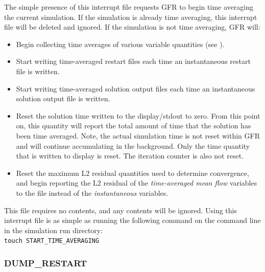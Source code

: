 The simple presence of this interrupt file requests GFR to begin time averaging
the current simulation.
%
If the simulation is already time averaging, this interrupt file will be deleted
and ignored.
%
If the simulation is not time averaging, GFR will:
\begin{itemize}
  \item Begin collecting time averages of various variable quantities (see
    ).
  \item Start writing time-averaged restart files
     each time an instantaneous restart
    file is written.
  \item Start writing time-averaged solution output files
     each time an
    instantaneous solution output file is written.
  \item Reset the solution time written to the display\slash stdout to zero.
    From this point on, this quantity will report the total amount of time that
    the solution has been time averaged. Note, the actual simulation time is not
    reset within GFR and will continue accumulating in the background.
    Only the time quantity that is written to display is reset.
    The iteration counter is also not reset.
  \item Reset the maximum L2 residual quantities used to determine
    convergence, and begin reporting the L2 residual of
    the \emph{time-averaged mean flow} variables to the 
    file instead of the \emph{instantaneous} variables.
\end{itemize}
%
This file requires no contents, and any contents will be ignored.
%
Using this interrupt file is as simple as running the following command on the
command line in the simulation run directory:
%
\\[1.2ex]\indent\texttt{touch START\_TIME\_AVERAGING}


\subsubsection{DUMP\_RESTART}
\label{SEC:Files:Interrupt:Dump_Restart}

